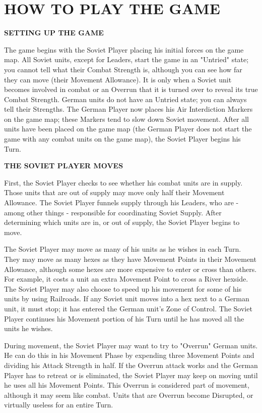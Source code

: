 \section{HOW TO PLAY THE GAME}

\textbf{SETTING UP THE GAME}

The game begins with the Soviet Player placing his initial forces on the game map. All Soviet units, except for Leaders, start the game in an "Untried" state; you cannot tell what their Combat Strength is, although you can see how far they can move (their Movement Allowance). It is only when a Soviet unit becomes involved in combat or an Overrun that it is turned over to reveal its true Combat Strength. German units do not have an Untried state; you can always tell their Strengths. The German Player now places his Air Interdiction Markers on the game map; these Markers tend to slow down Soviet movement. After all units have been placed on the game map (the German Player does not start the game with any combat units on the game map), the Soviet Player begins his Turn.

\textbf{THE SOVIET PLAYER MOVES}

First, the Soviet Player checks to see whether his combat units are in supply. Those units that are out of supply may move only half their Movement Allowance. The Soviet Player funnels supply through his Leaders, who are - among other things - responsible for coordinating Soviet Supply. After determining which units are in, or out of supply, the Soviet Player begins to move.

The Soviet Player may move as many of his units as he wishes in each Turn. They may move as many hexes as they have Movement Points in their Movement Allowance, although some hexes are more expensive to enter or cross than others. For example, it costs a unit an extra Movement Point to cross a River hexside. The Soviet Player may also choose to speed up his movement for some of his units by using Railroads. If any Soviet unit moves into a hex next to a German unit, it must stop; it has entered the German unit's Zone of Control. The Soviet Player continues his Movement portion of his Turn until he has moved all the units he wishes.

During movement, the Soviet Player may want to try to "Overrun" German units. He can do this in his Movement Phase by expending three Movement Points and dividing his Attack Strength in half. If the Overrun attack works and the German Player has to retreat or is eliminated, the Soviet Player may keep on moving until he uses all his Movement Points. This Overrun is considered part of movement, although it may seem like combat. Units that are Overrun become Disrupted, or virtually useless for an entire Turn.

